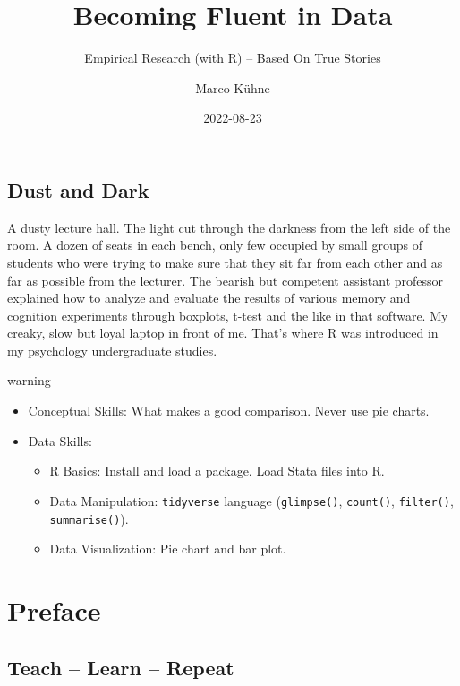 \documentclass[
]{book}
\title{Becoming Fluent in Data}
\subtitle{Empirical Research (with R) -- Based On True Stories}
\author{Marco Kühne}
\date{2022-08-23}
\providecommand{\tightlist}{%
  \setlength{\itemsep}{0pt}\setlength{\parskip}{0pt}}
\begin{document}
\maketitle

{
\setcounter{tocdepth}{1}
\tableofcontents
}
\hypertarget{dust-and-dark}{%
\chapter*{Dust and Dark}\label{dust-and-dark}}

A dusty lecture hall. The light cut through the darkness from the left side of the room. A dozen of seats in each bench, only few occupied by small groups of students who were trying to make sure that they sit far from each other and as far as possible from the lecturer. The bearish but competent assistant professor explained how to analyze and evaluate the results of various memory and cognition experiments through boxplots, t-test and the like in that software. My creaky, slow but loyal laptop in front of me. That's where R was introduced in my psychology undergraduate studies.

\begin{infobox2}warning

\begin{itemize}
\tightlist
\item
  Conceptual Skills: What makes a good comparison. Never use pie charts.
\item
  Data Skills:

  \begin{itemize}
  \tightlist
  \item
    R Basics: Install and load a package. Load Stata files into R.
  \item
    Data Manipulation: \texttt{tidyverse} language (\texttt{glimpse()}, \texttt{count()}, \texttt{filter()}, \texttt{summarise()}).
  \item
    Data Visualization: Pie chart and bar plot.
  \end{itemize}
\end{itemize}

\end{infobox2}

\hypertarget{part-preface}{%
\part{Preface}\label{part-preface}}

\hypertarget{teach-learn-repeat}{%
\chapter*{Teach -- Learn -- Repeat}\label{teach-learn-repeat}}
\end{document}
